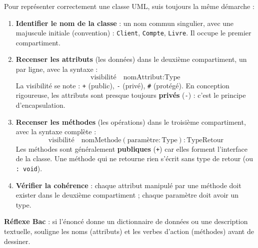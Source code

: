 \documentclass[11pt]{article}
\newcommand{\cle}[1]{{\popxbold\color{popdark}#1}}
\begin{document}
\begin{methode}
Pour représenter correctement une classe UML, suis toujours la même démarche :
\begin{enumerate}
\item \textbf{Identifier le nom de la classe} : un nom commun singulier, avec une majuscule initiale (convention) : \texttt{Client}, \texttt{Compte}, \texttt{Livre}. Il occupe le \cle{premier compartiment}.
\item \textbf{Recenser les attributs} (les données) dans le \cle{deuxième compartiment}, un par ligne, avec la syntaxe :
\[ \text{visibilité} \quad \text{nomAttribut} : \text{Type} \]
La visibilité se note : \texttt{+} (public), \texttt{-} (privé), \texttt{\#} (protégé). En conception rigoureuse, les attributs sont presque toujours \textbf{privés} (\texttt{-}) : c'est le principe d'\cle{encapsulation}.
\item \textbf{Recenser les méthodes} (les opérations) dans le \cle{troisième compartiment}, avec la syntaxe complète :
\[ \text{visibilité} \quad \text{nomMethode}(\text{paramètre} : \text{Type}) : \text{TypeRetour} \]
Les méthodes sont généralement \textbf{publiques} (\texttt{+}) car elles forment l'interface de la classe. Une méthode qui ne retourne rien s'écrit sans type de retour (ou \texttt{: void}).
\item \textbf{Vérifier la cohérence} : chaque attribut manipulé par une méthode doit exister dans le deuxième compartiment ; chaque paramètre doit avoir un type.
\end{enumerate}
\textbf{Réflexe Bac} : si l'énoncé donne un dictionnaire de données ou une description textuelle, souligne les noms (attributs) et les verbes d'action (méthodes) avant de dessiner.
\end{methode}
\end{document}
